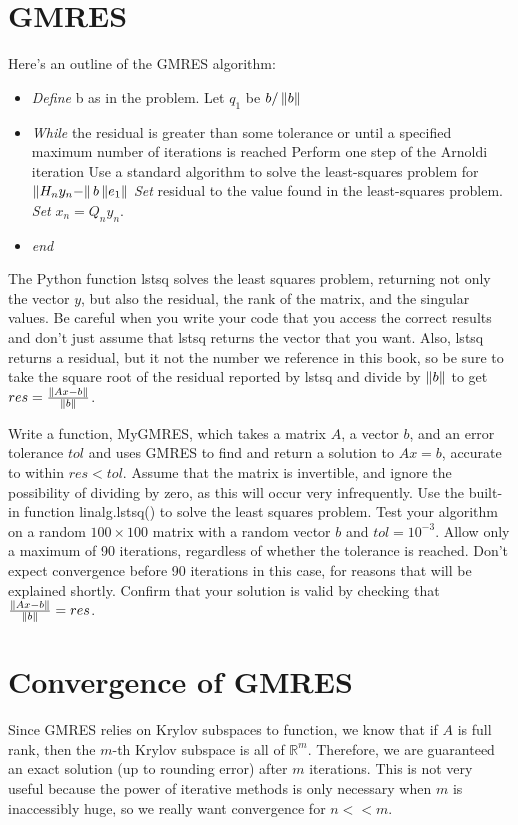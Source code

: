 \section*{GMRES}
Here's an outline of the GMRES algorithm:
\begin{itemize}
\item \emph{Define} b as in the problem. Let $q_1$ be $b/\left\lVert b\right\rVert$
\item \emph{While} the residual is greater than some tolerance or until a specified maximum number of 
iterations is reached
\subitem Perform one step of the Arnoldi iteration
\subitem Use a standard algorithm to solve the least-squares problem for $\left\lVert H_ny_n-\right\rVert b \left\lVert e_1\right\rVert$
\subitem \emph{Set} residual to the value found in the least-squares problem.
\subitem \emph{Set} $x_n=Q_n y_n$.
\item \emph{end}
\end{itemize}

\begin{warn}
The Python function lstsq solves the least squares problem, returning not only the vector $y$, but also the residual, the rank of the matrix, and the singular values.
Be careful when you write your code that you access the correct results and don't just assume that lstsq returns the vector that you want.
Also, lstsq returns a residual, but it not the number we reference in this book, so be sure to take the square root of the residual reported by lstsq and divide by $\left\lVert b\right\rVert$ to get $res=\frac{\left\lVert Ax-b\right\rVert}{\left\lVert b\right\rVert}$.
\end{warn}

\begin{problem}
Write a function, MyGMRES, which takes a matrix $A$, a vector $b$, and an error tolerance $tol$ and uses GMRES to find and return a solution to $Ax=b$, accurate to within $res<tol$.
Assume that the matrix is invertible, and ignore the possibility of dividing by zero, as this will occur very infrequently.
Use the built-in function linalg.lstsq() to solve the least squares problem.
Test your algorithm on a random $100\times 100$ matrix with a random vector $b$ and $tol=10^{-3}$.
Allow only a maximum of 90 iterations, regardless of whether the tolerance is reached.
Don't expect convergence before 90 iterations in this case, for reasons that will be explained shortly.
Confirm that your solution is valid by checking that $\frac{\left\lVert Ax-b\right\rVert}{\left\lVert b\right\rVert}=res$.
\end{problem}

\section*{Convergence of GMRES}
Since GMRES relies on Krylov subspaces to function, we know that if $A$ is full rank, then the $m$-th Krylov subspace is all of $\mathbb{R}^m$.
Therefore, we are guaranteed an exact solution (up to rounding error) after $m$ iterations.
This is not very useful because the power of iterative methods is only necessary when $m$ is inaccessibly huge, so we really want convergence for $n<<m$.

